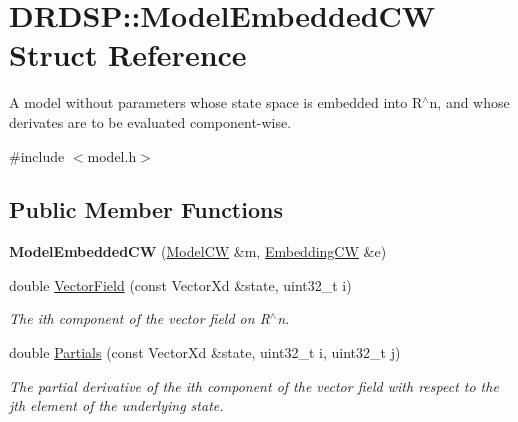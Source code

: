 \hypertarget{struct_d_r_d_s_p_1_1_model_embedded_c_w}{\section{D\-R\-D\-S\-P\-:\-:Model\-Embedded\-C\-W Struct Reference}
\label{struct_d_r_d_s_p_1_1_model_embedded_c_w}
}


A model without parameters whose state space is embedded into R$^\wedge$n, and whose derivates are to be evaluated component-\/wise.  




{\ttfamily \#include $<$model.\-h$>$}

\subsection*{Public Member Functions}
\begin{DoxyCompactItemize}
\item 
\hypertarget{struct_d_r_d_s_p_1_1_model_embedded_c_w_aa4d612f6d5c9060c38c99008b04b10dd}{{\bfseries Model\-Embedded\-C\-W} (\hyperlink{struct_d_r_d_s_p_1_1_model_c_w}{Model\-C\-W} \&m, \hyperlink{struct_d_r_d_s_p_1_1_embedding_c_w}{Embedding\-C\-W} \&e)}\label{struct_d_r_d_s_p_1_1_model_embedded_c_w_aa4d612f6d5c9060c38c99008b04b10dd}

\item 
\hypertarget{struct_d_r_d_s_p_1_1_model_embedded_c_w_a0d7f5f41f6211498d63de4e882b12dea}{double \hyperlink{struct_d_r_d_s_p_1_1_model_embedded_c_w_a0d7f5f41f6211498d63de4e882b12dea}{Vector\-Field} (const Vector\-Xd \&state, uint32\-\_\-t i)}\label{struct_d_r_d_s_p_1_1_model_embedded_c_w_a0d7f5f41f6211498d63de4e882b12dea}

\begin{DoxyCompactList}\small\item\em The ith component of the vector field on R$^\wedge$n. \end{DoxyCompactList}\item 
\hypertarget{struct_d_r_d_s_p_1_1_model_embedded_c_w_a6d82aae83ad411ddf8459aeeebc93d14}{double \hyperlink{struct_d_r_d_s_p_1_1_model_embedded_c_w_a6d82aae83ad411ddf8459aeeebc93d14}{Partials} (const Vector\-Xd \&state, uint32\-\_\-t i, uint32\-\_\-t j)}\label{struct_d_r_d_s_p_1_1_model_embedded_c_w_a6d82aae83ad411ddf8459aeeebc93d14}

\begin{DoxyCompactList}\small\item\em The partial derivative of the ith component of the vector field with respect to the jth element of the underlying state. \end{DoxyCompactList}\end{DoxyCompactItemize}

